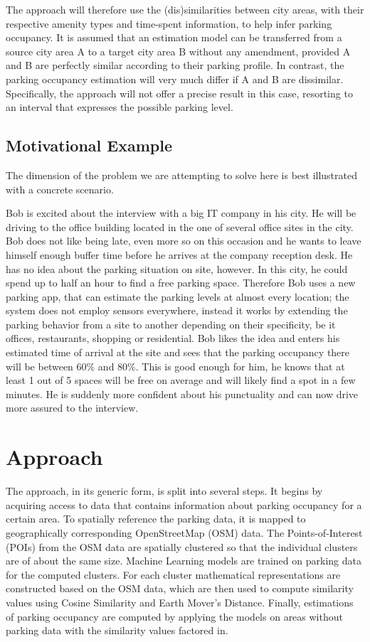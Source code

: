 \documentclass{ws-ijait}
\begin{document}
	The approach will therefore use the (dis)similarities between city areas, with their respective amenity types and time-spent information, to help infer parking occupancy. It is assumed that an estimation model can be transferred from a source city area A to a target city area B without any amendment, provided A and B are perfectly similar according to their parking profile. In contrast, the parking occupancy estimation will very much differ if A and B are dissimilar. Specifically, the approach will not offer a precise result in this case, resorting to an interval that expresses the possible parking level.
	
	\subsection{Motivational Example}
	The dimension of the problem we are attempting to solve here is best illustrated with a concrete scenario.
	
	Bob is excited about the interview with a big IT company in his city. He will be driving to the office building located in the one of several office sites in the city. Bob does not like being late, even more so on this occasion and he wants to leave himself enough buffer time before he arrives at the company reception desk. He has no idea about the parking situation on site, however. In this city, he could spend up to half an hour to find a free parking space. Therefore Bob uses a new parking app, that can estimate the parking levels at almost every location; the system does not employ sensors everywhere, instead it works by extending the parking behavior from a site to another depending on their specificity, be it offices, restaurants, shopping or residential. Bob likes the idea and enters his estimated time of arrival at the site and sees that the parking occupancy there will be between 60\% and 80\%. This is good enough for him, he knows that at least 1 out of 5 spaces will be free on average and will likely find a spot in a few minutes. He is suddenly more confident about his punctuality and can now drive more assured to the interview.
		
	\section{Approach}
	The approach, in its generic form, is split into several steps. It begins by acquiring access to data that contains information about parking occupancy for a certain area. To spatially reference the parking data, it is mapped to geographically corresponding OpenStreetMap (OSM) data. The Points-of-Interest (POIs) from the OSM data are spatially clustered so that the individual clusters are of about the same size. Machine Learning models are trained on parking data for the computed clusters. For each cluster mathematical representations are constructed based on the OSM data, which are then used to compute similarity values using Cosine Similarity and Earth Mover's Distance. Finally, estimations of parking occupancy are computed by applying the models on areas without parking data with the similarity values factored in.   
	
\end{document}
